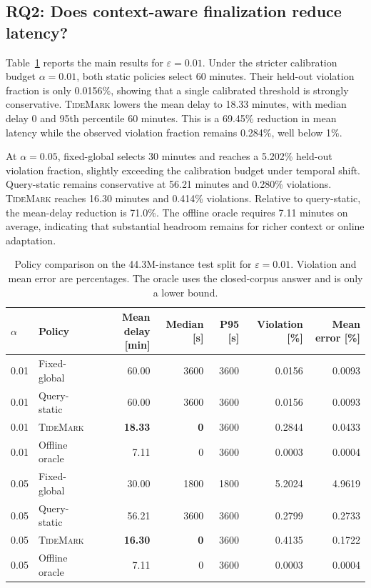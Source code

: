\documentclass[conference]{IEEEtran}
\newcommand{\tidemark}{\textsc{TideMark}}
\newcommand{\eps}{\varepsilon}
\begin{document}
\subsection{RQ2: Does context-aware finalization reduce latency?}
Table~\ref{tab:policies} reports the main results for $\eps=0.01$. Under the stricter calibration budget $\alpha=0.01$, both static policies select 60 minutes. Their held-out violation fraction is only 0.0156\%, showing that a single calibrated threshold is strongly conservative. \tidemark{} lowers the mean delay to 18.33 minutes, with median delay 0 and 95th percentile 60 minutes. This is a 69.45\% reduction in mean latency while the observed violation fraction remains 0.284\%, well below 1\%.

At $\alpha=0.05$, fixed-global selects 30 minutes and reaches a 5.202\% held-out violation fraction, slightly exceeding the calibration budget under temporal shift. Query-static remains conservative at 56.21 minutes and 0.280\% violations. \tidemark{} reaches 16.30 minutes and 0.414\% violations. Relative to query-static, the mean-delay reduction is 71.0\%. The offline oracle requires 7.11 minutes on average, indicating that substantial headroom remains for richer context or online adaptation.

\begin{table}[t]
\caption{Policy comparison on the 44.3M-instance test split for $\eps=0.01$. Violation and mean error are percentages. The oracle uses the closed-corpus answer and is only a lower bound.}
\label{tab:policies}
\centering
\begin{tabular}{llrrrrr}
\toprule
$\alpha$ & Policy & Mean delay [min] & Median [s] & P95 [s] & Violation [\%] & Mean error [\%] \\
\midrule
0.01 & Fixed-global & 60.00 & 3600 & 3600 & 0.0156 & 0.0093 \\
0.01 & Query-static & 60.00 & 3600 & 3600 & 0.0156 & 0.0093 \\
0.01 & \tidemark{} & \textbf{18.33} & \textbf{0} & 3600 & 0.2844 & 0.0433 \\
0.01 & Offline oracle & 7.11 & 0 & 3600 & 0.0003 & 0.0004 \\
\midrule
0.05 & Fixed-global & 30.00 & 1800 & 1800 & 5.2024 & 4.9619 \\
0.05 & Query-static & 56.21 & 3600 & 3600 & 0.2799 & 0.2733 \\
0.05 & \tidemark{} & \textbf{16.30} & \textbf{0} & 3600 & 0.4135 & 0.1722 \\
0.05 & Offline oracle & 7.11 & 0 & 3600 & 0.0003 & 0.0004 \\
\bottomrule
\end{tabular}
\end{table}
\end{document}
